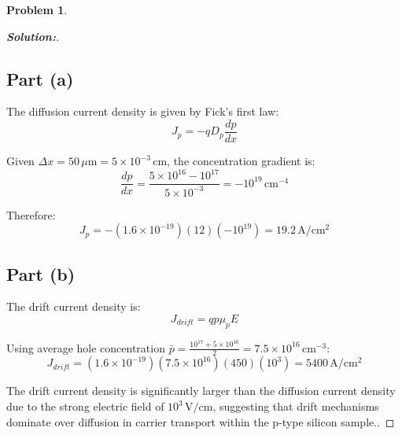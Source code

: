 \documentclass[12pt]{article}
\theoremstyle{definition}\newtheorem{problem}{Problem}
\newenvironment{solution}{\begin{proof}[\bfseries\textup{Solution:}]}{\end{proof}}
\begin{document}
\newpage
\begin{problem}

\end{problem}
\begin{solution}


    \subsection*{Part (a) }
    The diffusion current density is given by Fick's first law:
    $$J_p = -qD_p\frac{dp}{dx}$$
    
    Given $\Delta x = 50\,\mu\text{m} = 5\times10^{-3}\,\text{cm}$, the concentration gradient is:
    $$\frac{dp}{dx} = \frac{5\times10^{16} - 10^{17}}{5\times10^{-3}} = -10^{19}\,\text{cm}^{-4}$$
    
    Therefore:
    $$J_p = -(1.6\times10^{-19})(12)(-10^{19}) = 19.2\,\text{A}/\text{cm}^2$$
    
    \subsection*{Part (b) }
    The drift current density is:
    $$J_{drift} = qp\mu_pE$$
    
    Using average hole concentration $\bar{p} = \frac{10^{17} + 5\times10^{16}}{2} = 7.5\times10^{16}\,\text{cm}^{-3}$:
    $$J_{drift} = (1.6\times10^{-19})(7.5\times10^{16})(450)(10^3) = 5400\,\text{A}/\text{cm}^2$$
    
    The drift current density is significantly larger than the diffusion current density due to the strong electric field of $10^3\,\text{V}/\text{cm}$, suggesting that drift mechanisms dominate over diffusion in carrier transport within the p-type silicon sample..

\end{solution}

\end{document}
